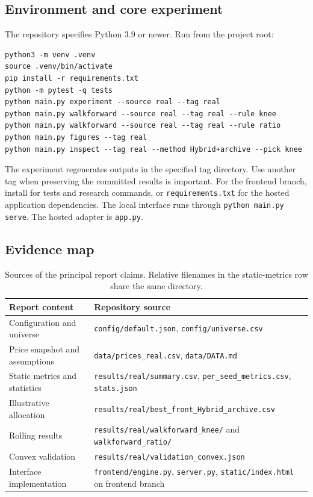 \documentclass[12pt,a4paper]{article}
\begin{document}
\subsection{Environment and core experiment}
The repository specifies Python 3.9 or newer. Run from the project root:
\begin{lstlisting}
python3 -m venv .venv
source .venv/bin/activate
pip install -r requirements.txt
python -m pytest -q tests
python main.py experiment --source real --tag real
python main.py walkforward --source real --tag real --rule knee
python main.py walkforward --source real --tag real --rule ratio
python main.py figures --tag real
python main.py inspect --tag real --method Hybrid+archive --pick knee
\end{lstlisting}
The experiment regenerates outputs in the specified tag directory. Use another tag when preserving the committed results is important. For the frontend branch, install  for tests and research commands, or \texttt{requirements.txt} for the hosted application dependencies. The local interface runs through \texttt{python main.py serve}. The hosted adapter is \texttt{app.py}.
\subsection{Evidence map}
\begin{table}[H]\centering\small
\begin{tabularx}{\linewidth}{@{}p{49mm}Y@{}}\toprule
Report content & Repository source\\\midrule
Configuration and universe & \texttt{config/default.json}, \texttt{config/universe.csv}\\
Price snapshot and assumptions & \texttt{data/prices\_real.csv}, \texttt{data/DATA.md}\\
Static metrics and statistics & \texttt{results/real/summary.csv}, \texttt{per\_seed\_metrics.csv}, \texttt{stats.json}\\
Illustrative allocation & \texttt{results/real/best\_front\_Hybrid\_archive.csv}\\
Rolling results & \texttt{results/real/walkforward\_knee/} and \texttt{walkforward\_ratio/}\\
Convex validation & \texttt{results/real/validation\_convex.json}\\
Interface implementation & \texttt{frontend/engine.py}, \texttt{server.py}, \texttt{static/index.html} on frontend branch\\\bottomrule
\end{tabularx}
\caption{Sources of the principal report claims. Relative filenames in the static-metrics row share the same directory.}
\end{table}
\end{document}
